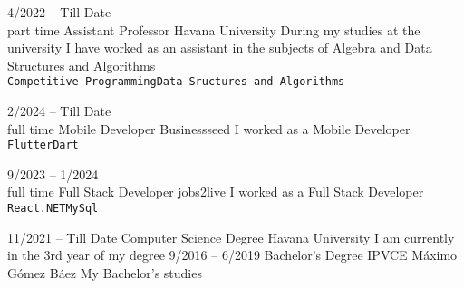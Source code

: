 \documentclass[9pt]{developercv} %
\begin{document}
\begin{entrylist}
	\entry
	{4/2022 -- Till Date\\\footnotesize{part time}}
	{Assistant Professor}
	{Havana University}
	{During my studies at the university I have worked as an assistant in the subjects of Algebra
		and Data Structures and Algorithms\\ \texttt{Competitive Programming}\slashsep\texttt{Data Sructures and Algorithms}}

	\entry
	{2/2024 -- Till Date\\\footnotesize{full time}}
	{Mobile Developer}
	{Businessseed}
	{I worked as a Mobile Developer\\ \texttt{Flutter}\slashsep\texttt{Dart}}
	
	\entry
	{9/2023 -- 1/2024\\\footnotesize{full time}}
	{Full Stack Developer}
	{jobs2live}
	{I worked as a Full Stack Developer\\ \texttt{React}\slashsep\texttt{.NET}\slashsep\texttt{MySql}}

\end{entrylist}



\begin{entrylist}
	\entry
	{11/2021 -- Till Date}
	{Computer Science Degree}
	{Havana University}
	{I am currently in the 3rd year of my degree}
	\entry
	{9/2016 -- 6/2019}
	{Bachelor's Degree}
	{IPVCE M\'aximo G\'omez B\'aez}
	{My Bachelor's studies}
\end{entrylist}

\end{document}
